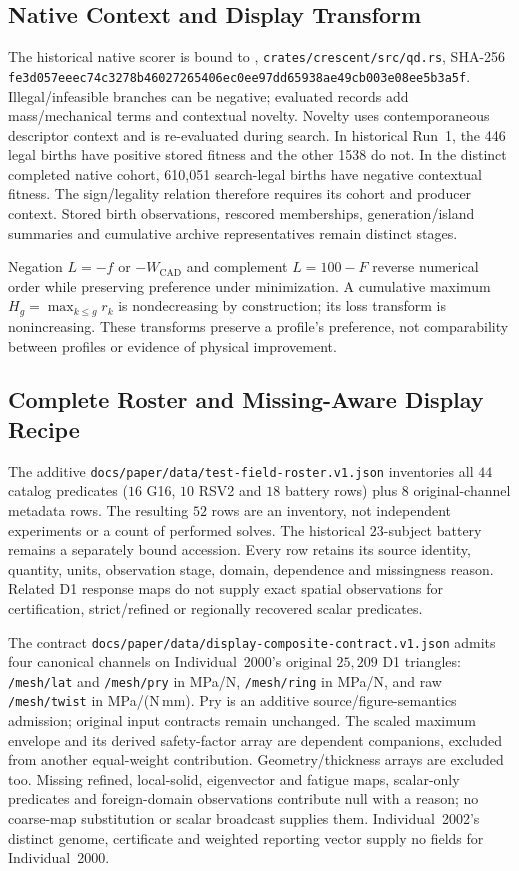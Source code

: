 \subsection{Native Context and Display Transform}
The historical native scorer is bound to , \nolinkurl{crates/crescent/src/qd.rs}, SHA-256 \nolinkurl{fe3d057eeec74c3278b46027265406ec0ee97dd65938ae49cb003e08ee5b3a5f}. Illegal/infeasible branches can be negative; evaluated records add mass/mechanical terms and contextual novelty. Novelty uses contemporaneous descriptor context and is re-evaluated during search. In historical Run~1, the 446 legal births have positive stored fitness and the other 1538 do not. In the distinct completed native cohort, 610,051 search-legal births have negative contextual fitness. The sign/legality relation therefore requires its cohort and producer context. Stored birth observations, rescored memberships, generation/island summaries and cumulative archive representatives remain distinct stages.

Negation $L=-f$ or $-W_{\mathrm{CAD}}$ and complement $L=100-F$ reverse numerical order while preserving preference under minimization. A cumulative maximum $H_g=\max_{k\le g}r_k$ is nondecreasing by construction; its loss transform is nonincreasing. These transforms preserve a profile's preference, not comparability between profiles or evidence of physical improvement.

\subsection{Complete Roster and Missing-Aware Display Recipe}
The additive \nolinkurl{docs/paper/data/test-field-roster.v1.json} inventories all $44$ catalog predicates ($16$ G16, $10$ RSV2 and $18$ battery rows) plus $8$ original-channel metadata rows. The resulting $52$ rows are an inventory, not independent experiments or a count of performed solves. The historical $23$-subject battery remains a separately bound accession. Every row retains its source identity, quantity, units, observation stage, domain, dependence and missingness reason. Related D1 response maps do not supply exact spatial observations for certification, strict/refined or regionally recovered scalar predicates.

The contract \nolinkurl{docs/paper/data/display-composite-contract.v1.json} admits four canonical channels on Individual~2000's original $25{,}209$ D1 triangles: \nolinkurl{/mesh/lat} and \nolinkurl{/mesh/pry} in MPa/N, \nolinkurl{/mesh/ring} in MPa/N, and raw \nolinkurl{/mesh/twist} in MPa/(N\,mm). Pry is an additive source/figure-semantics admission; original input contracts remain unchanged. The scaled maximum envelope and its derived safety-factor array are dependent companions, excluded from another equal-weight contribution. Geometry/thickness arrays are excluded too. Missing refined, local-solid, eigenvector and fatigue maps, scalar-only predicates and foreign-domain observations contribute null with a reason; no coarse-map substitution or scalar broadcast supplies them. Individual~2002's distinct genome, certificate and weighted reporting vector supply no fields for Individual~2000.

